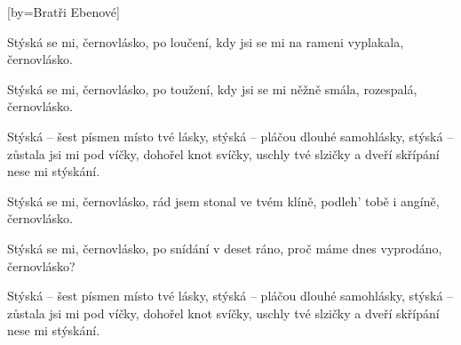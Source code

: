 [by={Bratři Ebenové}]

\beginverse{}
Stýská se mi, černovlásko,
po loučení, kdy jsi se mi
na rameni vyplakala, černovlásko.  
\endverse{}

\beginverse{}
\chordsoff{}
Stýská se mi, černovlásko,
po toužení, kdy jsi se mi
něžně smála, rozespalá, černovlásko.  
\chordson{}
\endverse{}

\beginchorus{}
Stýská -- šest písmen místo tvé lásky,
stýská -- pláčou dlouhé samohlásky,
stýská -- zůstala jsi mi pod víčky,
dohořel knot svíčky, uschly tvé slzičky
a dveří skřípání nese mi stýskání.
\endchorus{}

\beginverse{}
\chordsoff{}
Stýská se mi, černovlásko,
rád jsem stonal ve tvém klíně,
podleh' tobě i angíně, černovlásko.  
\chordson{}
\endverse{}

\beginverse{}
\chordsoff{}
Stýská se mi, černovlásko,
po snídání v deset ráno,
proč máme dnes vyprodáno, černovlásko?  
\chordson{}
\endverse{}

\repeatingchorus{}
\beginchorus{}
\chordsoff{}
Stýská -- šest písmen místo tvé lásky,
stýská -- pláčou dlouhé samohlásky,
stýská -- zůstala jsi mi pod víčky,
dohořel knot svíčky, uschly tvé slzičky
a dveří skřípání nese mi stýskání.
\chordson{}
\endchorus{}

